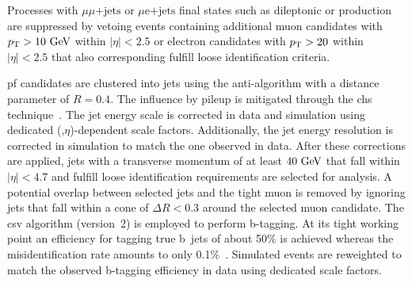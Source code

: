 
Processes with $\mu\mu\mathrm{\mbox{+}jets}$ or $\mu\mathrm{e}\mathrm{\mbox{+}jets}$ final states such as dileptonic \ttbar or \zjets production are suppressed by vetoing events containing additional muon candidates with $p_\textrm{T}>10~\textrm{GeV}$ within $|\eta|<2.5$ or electron candidates with $p_\textrm{T}>20$ within $|\eta|<2.5$ that also corresponding fulfill loose identification criteria.

\Gls{pf} candidates are clustered into jets using the anti-\kt algorithm with a distance parameter of $R=0.4$. The influence by pileup is mitigated through the \gls{chs} technique~\cite{CMS-PAS-JME-14-001}. The jet energy scale is corrected in data and simulation using dedicated (\pt,$\eta$)-dependent scale factors. Additionally, the jet energy resolution is corrected in simulation to match the one observed in data. After these corrections are applied, jets with a transverse momentum of at least $40~\textrm{GeV}$ that fall within $|\eta|<4.7$ and fulfill loose identification requirements are selected for analysis. A potential overlap between selected jets and the tight muon is removed by ignoring jets that fall within a cone of $\Delta R<0.3$ around the selected muon candidate. The \acrfull{csv} algorithm (version~2) is employed to perform b-tagging. At its tight working point an efficiency for tagging true b~jets of about 50\% is achieved whereas the misidentification rate amounts to only 0.1\%~\cite{CMS-PAS-BTV-15-001}. Simulated events are reweighted to match the observed b-tagging efficiency in data using dedicated scale factors.




